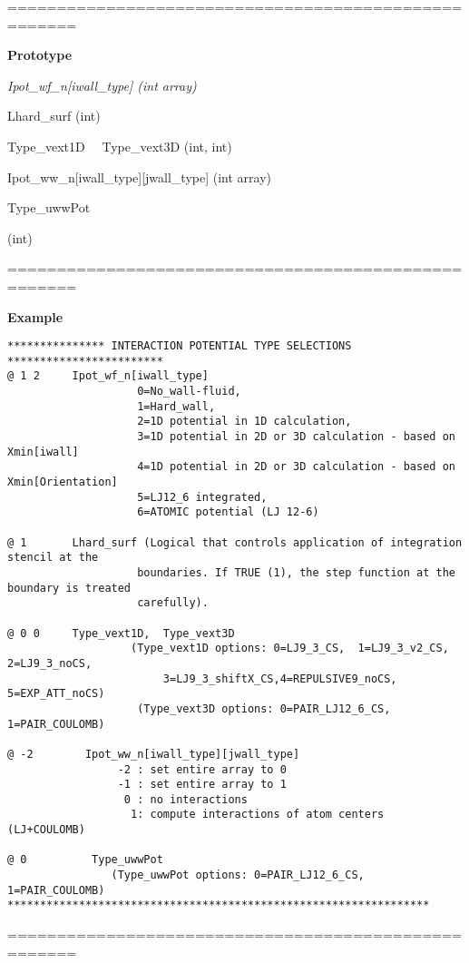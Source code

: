 \documentclass[10pt,onecolumn]{article}
\begin{document}
\vspace{0.1in}
\noindent=====================================================

{\bf Prototype}

{\it Ipot\_wf\_n[iwall\_type] (int array)

Lhard\_surf (int)

Type\_vext1D \ \  Type\_vext3D (int, int)

Ipot\_ww\_n[iwall\_type][jwall\_type] (int array)

Type\_uwwPot} (int)

\noindent=====================================================

{\bf Example}

\begin{verbatim}
*************** INTERACTION POTENTIAL TYPE SELECTIONS ************************
@ 1 2     Ipot_wf_n[iwall_type]
                    0=No_wall-fluid,
                    1=Hard_wall,
                    2=1D potential in 1D calculation,
                    3=1D potential in 2D or 3D calculation - based on Xmin[iwall]
                    4=1D potential in 2D or 3D calculation - based on Xmin[Orientation]
                    5=LJ12_6 integrated,
                    6=ATOMIC potential (LJ 12-6)
                           
@ 1       Lhard_surf (Logical that controls application of integration stencil at the 
                    boundaries. If TRUE (1), the step function at the boundary is treated 
                    carefully).
                           
@ 0 0     Type_vext1D,  Type_vext3D
                   (Type_vext1D options: 0=LJ9_3_CS,  1=LJ9_3_v2_CS, 2=LJ9_3_noCS, 
                        3=LJ9_3_shiftX_CS,4=REPULSIVE9_noCS, 5=EXP_ATT_noCS)
                    (Type_vext3D options: 0=PAIR_LJ12_6_CS, 1=PAIR_COULOMB)

@ -2        Ipot_ww_n[iwall_type][jwall_type]
	             -2 : set entire array to 0
	             -1 : set entire array to 1
	              0 : no interactions
	               1: compute interactions of atom centers (LJ+COULOMB)
	                   
@ 0          Type_uwwPot  
          	    (Type_uwwPot options: 0=PAIR_LJ12_6_CS, 1=PAIR_COULOMB)	                 
*****************************************************************
\end{verbatim}

\noindent=====================================================
\vspace{0.1in}
\end{document}
